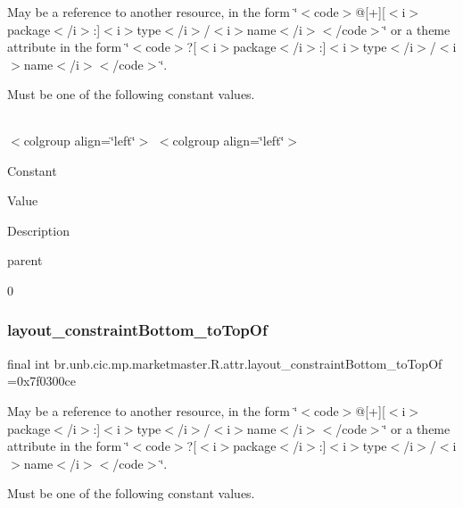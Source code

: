 May be a reference to another resource, in the form \char`\"{}$<$code$>$@\mbox{[}+\mbox{]}\mbox{[}$<$i$>$package$<$/i$>$\+:\mbox{]}$<$i$>$type$<$/i$>$/$<$i$>$name$<$/i$>$$<$/code$>$\char`\"{} or a theme attribute in the form \char`\"{}$<$code$>$?\mbox{[}$<$i$>$package$<$/i$>$\+:\mbox{]}$<$i$>$type$<$/i$>$/$<$i$>$name$<$/i$>$$<$/code$>$\char`\"{}. 

Must be one of the following constant values.

\tabulinesep=1mm
\begin{longtabu} spread 0pt [c]{*{0}{|X[-1]}|}
\hline
\end{longtabu}
$<$colgroup align=\char`\"{}left\char`\"{}$>$ $<$colgroup align=\char`\"{}left\char`\"{}$>$ 

Constant

Value

Description 

parent

0\mbox{\label{classbr_1_1unb_1_1cic_1_1mp_1_1marketmaster_1_1R_1_1attr_a57edcd16d73518020f163daf4270737d}} 
\subsubsection{\texorpdfstring{layout\+\_\+constraint\+Bottom\+\_\+to\+Top\+Of}{layout\_constraintBottom\_toTopOf}}
{\footnotesize\ttfamily final int br.\+unb.\+cic.\+mp.\+marketmaster.\+R.\+attr.\+layout\+\_\+constraint\+Bottom\+\_\+to\+Top\+Of =0x7f0300ce\hspace{0.3cm}{\ttfamily [static]}}

May be a reference to another resource, in the form \char`\"{}$<$code$>$@\mbox{[}+\mbox{]}\mbox{[}$<$i$>$package$<$/i$>$\+:\mbox{]}$<$i$>$type$<$/i$>$/$<$i$>$name$<$/i$>$$<$/code$>$\char`\"{} or a theme attribute in the form \char`\"{}$<$code$>$?\mbox{[}$<$i$>$package$<$/i$>$\+:\mbox{]}$<$i$>$type$<$/i$>$/$<$i$>$name$<$/i$>$$<$/code$>$\char`\"{}. 

Must be one of the following constant values.

